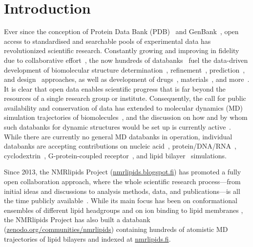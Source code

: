\documentclass[journal=jcisd8,manuscript=article,layout=twocolumn]{achemso}
\begin{document}
\twocolumn
\section{Introduction}
Ever since the conception of Protein Data Bank (PDB)~\cite{nnb1971,wwPDB2019} and GenBank~\cite{jordan1982,sayers2020},
open access to standardised and searchable pools of experimental data has
revolutionized
scientific
research. %
Constantly growing and improving in fidelity
due to collaborative effort~\cite{levitt2007,Brzezinski:2020a,Harris:2003a,Steinegger:2020a}, %
the now hundreds of databanks~\cite{Rigden:2020a}
fuel the data-driven development of
biomolecular structure determination~\cite{Simpkin:2019a},
refinement~\cite{Leelananda:2020a}, %
prediction~\cite{Senior:2020a}, and
design~\cite{huang2016} approaches,
as well as development of
drugs~\cite{Westbrook:2019a,Martinez-Mayorga:2020a}, %
materials~\cite{Senderowitz:2018a,Wan:2019a},
and more~\cite{Perez-Riverol:2019a,Feng:2020a}.
It is clear that open data enables scientific
progress that is far beyond the resources of a single research group or institute.
%
Consequently,
the call for public availability and conservation of data has extended to molecular dynamics (MD) simulation trajectories of biomolecules~\cite{Feig:1999a,Tai:2004a,Silva:2006a}, and the discussion on how and by whom such databanks for dynamic structures would be set up is currently active~\cite{Hildebrand:2019a,Abraham:2019a,Abriata:2020a,Hospital:2020a}.
%
%
While there are currently no general MD databanks in operation,
individual databanks are accepting contributions on
nucleic acid~\cite{Hospital:2016a}, %
protein/DNA/RNA~\cite{Bekker:2020a}, %
cyclodextrin~\cite{Mixcoha:2016a}, %
G-protein-coupled receptor~\cite{Rodriguez-Espigares:2019a}, %
and lipid bilayer~\cite{Miettinen:2019c} %
simulations.

Since 2013, the NMRlipids Project (\url{nmrlipids.blogspot.fi}) has
promoted a fully open collaboration approach, where
the whole scientific research process---from initial ideas and discussions to
analysis methods, data, and publications---is all the time publicly available~\cite{botan15}.
While its main focus has been on conformational ensembles
of different lipid headgroups and on ion binding to lipid membranes \cite{botan15,catte16,Antila:2019a},
the NMR\-lipids Project has also built a databank~\cite{Miettinen:2019c} (\url{zenodo.org/communities/nmrlipids}) containing hundreds
of atomistic MD trajectories of lipid bilayers and
indexed at \url{nmrlipids.fi}.
\end{document}
